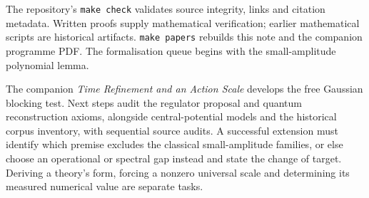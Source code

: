 \documentclass[11pt,a4paper]{article}
\begin{document}
The repository's \texttt{make check} validates source integrity, links and
citation metadata. Written proofs supply mathematical verification;
earlier mathematical scripts are historical artifacts. \texttt{make papers} rebuilds this note
and the companion programme PDF. The formalisation queue begins with the
small-amplitude polynomial lemma.

The companion \emph{Time Refinement and an Action Scale} develops the free
Gaussian blocking test. Next steps audit the regulator proposal and quantum
reconstruction axioms, alongside central-potential models and the historical
corpus inventory, with sequential source audits.
A successful extension must
identify which premise excludes the classical small-amplitude families, or else
choose an operational or spectral gap instead and state the change of target.
Deriving a theory's form, forcing a nonzero universal scale and determining its
measured numerical value are separate tasks.



\end{document}
